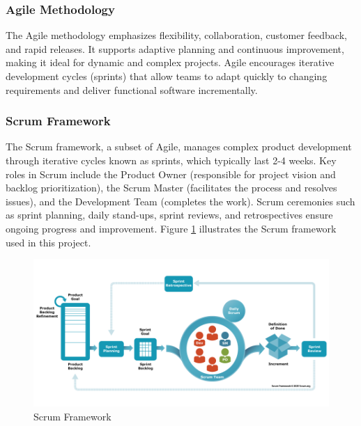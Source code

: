 \subsubsection{Agile Methodology}
The Agile methodology emphasizes flexibility, collaboration, customer feedback, and rapid releases. It supports adaptive planning and continuous improvement, making it ideal for dynamic and complex projects. Agile encourages iterative development cycles (sprints) that allow teams to adapt quickly to changing requirements and deliver functional software incrementally.

\subsubsection{Scrum Framework}
The Scrum framework, a subset of Agile, manages complex product development through iterative cycles known as sprints, which typically last 2-4 weeks. Key roles in Scrum include the Product Owner (responsible for project vision and backlog prioritization), the Scrum Master (facilitates the process and resolves issues), and the Development Team (completes the work). Scrum ceremonies such as sprint planning, daily stand-ups, sprint reviews, and retrospectives ensure ongoing progress and improvement. Figure \ref{fig:Scrum Framework} illustrates the Scrum framework used in this project.

\begin{figure}[H]
  \centering
  \includegraphics[width=1\textwidth]{Images/scrum.png}
  \caption{Scrum Framework}
  \label{fig:Scrum Framework}
\end{figure}

